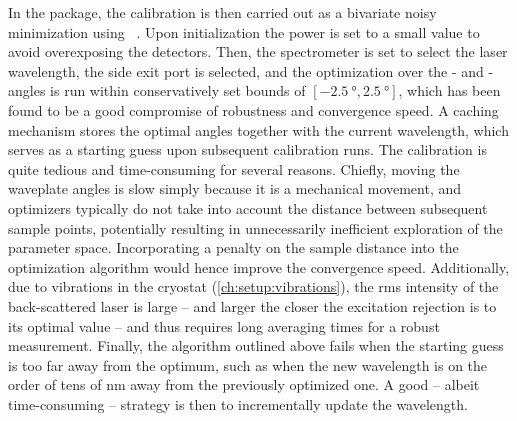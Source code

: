 In the \mjolnir package, the calibration is then carried out as a bivariate noisy minimization using ~\cite{Mayer2016}.
Upon initialization the power is set to a small value to avoid overexposing the detectors.
Then, the spectrometer is set to select the laser wavelength, the side exit port is selected, and the optimization over the \quarterwave- and \halfwave-angles is run within conservatively set bounds of $[\qty{-2.5}{\degree}, \qty{2.5}{\degree}]$, which has been found to be a good compromise of robustness and convergence speed.
A caching mechanism stores the optimal angles together with the current wavelength, which serves as a starting guess upon subsequent calibration runs.
The calibration is quite tedious and time-consuming for several reasons.
Chiefly, moving the waveplate angles is slow simply because it is a mechanical movement, and optimizers typically do not take into account the distance between subsequent sample points, potentially resulting in unnecessarily inefficient exploration of the parameter space.
Incorporating a penalty on the sample distance into the optimization algorithm would hence improve the convergence speed.
Additionally, due to vibrations in the cryostat (\cref{ch:setup:vibrations}), the \gls{rms} intensity of the back-scattered laser is large -- and larger the closer the excitation rejection is to its optimal value -- and thus requires long averaging times for a robust measurement.
Finally, the algorithm outlined above fails when the starting guess is too far away from the optimum, such as when the new wavelength is on the order of tens of \unit{nm} away from the previously optimized one.
A good -- albeit time-consuming -- strategy is then to incrementally update the wavelength.

